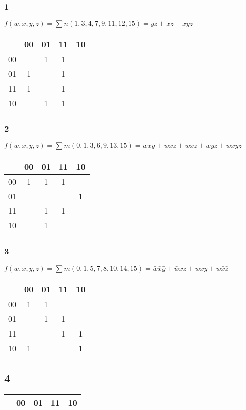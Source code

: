 \documentclass[12pt,a4paper,openany]{book}
\begin{document}
	\subsubsection{1}
	$f(w,x,y,z) = \sum n(1,3,4,7,9,11,12,15) = yz+\bar x z + x\bar y \bar z$
	\\
	\begin{tabular}{c|c|c|c|c|}
		& 00&01&11&10\\
		\hline
		00&&1&1&\\
		\hline
		01&1&&1&\\
		\hline
		11&1&&1&\\
		\hline
		10&&1&1&\\
		\hline
	\end{tabular}
	\subsubsection{2}
	$f(w,x,y,z) = \sum m(0,1,3,6,9,13,15) = \bar w \bar x \bar y + \bar w \bar x z + wxz + w\bar y z+w\bar x y \bar z$\\
	\begin{tabular}{c|c|c|c|c|}
		& 00&01&11&10\\
		\hline
		00&1&1&1&\\
		\hline
		01&&&&1\\
		\hline
		11&&1&1&\\
		\hline
		10&&1&&\\
		\hline
	\end{tabular}
	\subsubsection{3}
	$f(w,x,y,z) = \sum m (0,1,5,7,8,10,14,15) = \bar w \bar x \bar y +  \bar w x z + wxy + w\bar x \bar  z$\\
	\begin{tabular}{c|c|c|c|c|}
		& 00&01&11&10\\
		\hline
		00&1&1&&\\
		\hline
		01&&1&1&\\
		\hline
		11&&&1&1\\
		\hline
		10&1&&&1\\
		\hline
	\end{tabular}

	\subsection{4}
	\begin{tabular}{c|c|c|c|c|}
		& 00&01&11&10\\
		\hline
	\end{tabular}
\end{document}
